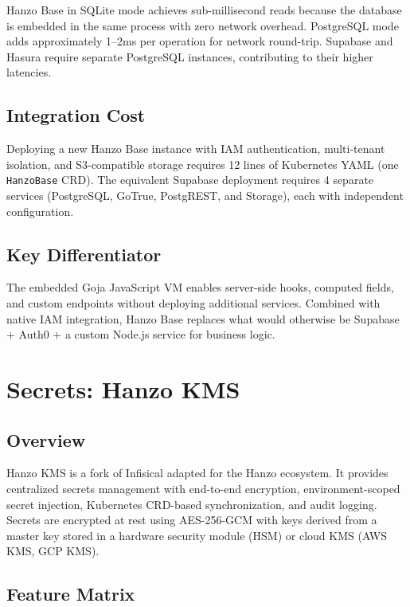 \documentclass[11pt,twocolumn]{article}
\begin{document}
Hanzo Base in SQLite mode achieves sub-millisecond reads because the database is embedded in the same process with zero network overhead. PostgreSQL mode adds approximately 1--2ms per operation for network round-trip. Supabase and Hasura require separate PostgreSQL instances, contributing to their higher latencies.

\subsection{Integration Cost}

Deploying a new Hanzo Base instance with IAM authentication, multi-tenant isolation, and S3-compatible storage requires 12 lines of Kubernetes YAML (one \texttt{HanzoBase} CRD). The equivalent Supabase deployment requires 4 separate services (PostgreSQL, GoTrue, PostgREST, and Storage), each with independent configuration.

\subsection{Key Differentiator}

The embedded Goja JavaScript VM enables server-side hooks, computed fields, and custom endpoints without deploying additional services. Combined with native IAM integration, Hanzo Base replaces what would otherwise be Supabase + Auth0 + a custom Node.js service for business logic.

\section{Secrets: Hanzo KMS}
\label{sec:kms}

\subsection{Overview}

Hanzo KMS is a fork of Infisical adapted for the Hanzo ecosystem. It provides centralized secrets management with end-to-end encryption, environment-scoped secret injection, Kubernetes CRD-based synchronization, and audit logging. Secrets are encrypted at rest using AES-256-GCM with keys derived from a master key stored in a hardware security module (HSM) or cloud KMS (AWS KMS, GCP KMS).

\subsection{Feature Matrix}
\end{document}
